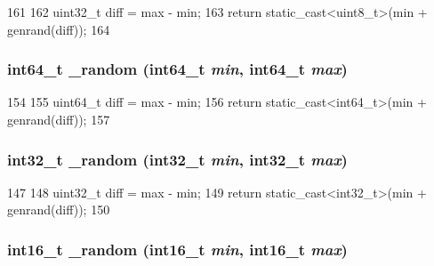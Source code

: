 \begin{DoxyCode}
161     {
162         uint32_t diff = max - min;
163         return static_cast<uint8_t>(min + genrand(diff));
164     }
\end{DoxyCode}
\hypertarget{classRandom_a5887d5ae0625ec51d34c6a43d59de941}{
\subsubsection[{\_\-random}]{\setlength{\rightskip}{0pt plus 5cm}int64\_\-t \_\-random (int64\_\-t {\em min}, \/  int64\_\-t {\em max})}}
\label{classRandom_a5887d5ae0625ec51d34c6a43d59de941}



\begin{DoxyCode}
154     {
155         uint64_t diff = max - min;
156         return static_cast<int64_t>(min + genrand(diff));
157     }
\end{DoxyCode}
\hypertarget{classRandom_acd2b1e75098a84c5326b235ccd8da882}{
\subsubsection[{\_\-random}]{\setlength{\rightskip}{0pt plus 5cm}int32\_\-t \_\-random (int32\_\-t {\em min}, \/  int32\_\-t {\em max})}}
\label{classRandom_acd2b1e75098a84c5326b235ccd8da882}



\begin{DoxyCode}
147     {
148         uint32_t diff = max - min;
149         return static_cast<int32_t>(min + genrand(diff));
150     }
\end{DoxyCode}
\hypertarget{classRandom_a8c35620ab378916d0f7c9b0bd856d5b4}{
\subsubsection[{\_\-random}]{\setlength{\rightskip}{0pt plus 5cm}int16\_\-t \_\-random (int16\_\-t {\em min}, \/  int16\_\-t {\em max})}}
\label{classRandom_a8c35620ab378916d0f7c9b0bd856d5b4}



